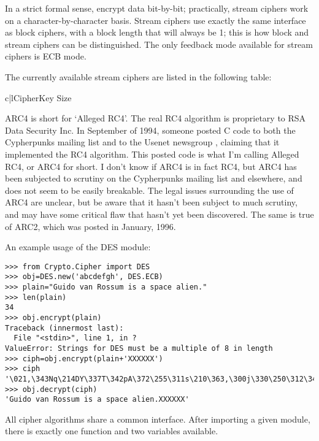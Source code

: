 \documentclass{howto}
\begin{document}
In a strict formal sense,  encrypt data bit-by-bit;
practically, stream ciphers work on a character-by-character basis.
Stream ciphers use exactly the
same interface as block ciphers, with a block length that will always
be 1; this is how block and stream ciphers can be distinguished. 
The only feedback mode available for stream ciphers is ECB mode. 

The currently available stream ciphers are listed in the following table:

\begin{tableii}{c|l}{}{Cipher}{Key Size}
\end{tableii}

ARC4 is short for `Alleged RC4'.  The real RC4 algorithm is proprietary
to RSA Data Security Inc.  In September of 1994, someone posted C code
to both the Cypherpunks mailing list and to the Usenet newsgroup
, claiming that it implemented the RC4 algorithm.  This
posted code is what I'm calling Alleged RC4, or ARC4 for short.  I don't
know if ARC4 is in fact RC4, but ARC4 has been subjected to scrutiny on
the Cypherpunks mailing list and elsewhere, and does not seem to be
easily breakable.  The legal issues surrounding the use of ARC4 are
unclear, but be aware that it hasn't been subject to much scrutiny, and
may have some critical flaw that hasn't yet been discovered.  The same
is true of ARC2, which was posted in January, 1996.

An example usage of the DES module:
\begin{verbatim}
>>> from Crypto.Cipher import DES
>>> obj=DES.new('abcdefgh', DES.ECB)
>>> plain="Guido van Rossum is a space alien."
>>> len(plain)
34
>>> obj.encrypt(plain)
Traceback (innermost last):
  File "<stdin>", line 1, in ?
ValueError: Strings for DES must be a multiple of 8 in length
>>> ciph=obj.encrypt(plain+'XXXXXX')
>>> ciph
'\021,\343Nq\214DY\337T\342pA\372\255\311s\210\363,\300j\330\250\312\347\342I\3215w\03561\303dgb/\006'
>>> obj.decrypt(ciph)
'Guido van Rossum is a space alien.XXXXXX'
\end{verbatim}


All cipher algorithms share a common interface.  After importing a
given module, there is exactly one function and two variables
available.
\end{document}
